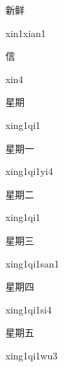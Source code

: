 \begin{multicols*}{2}
\begin{verbete}{新鲜}
\begin{pronuncia}{xin1xian1}
\end{pronuncia}
\end{verbete}

\begin{verbete}[xin4]{信}
\begin{pronuncia}{xin4}
\end{pronuncia}
\end{verbete}

\begin{verbete}[xing1qi1]{星期}
\begin{pronuncia}{xing1qi1}
\end{pronuncia}
\end{verbete}

\begin{verbete}[xing1qi1yi4]{星期一}
\begin{pronuncia}{xing1qi1yi4}
\end{pronuncia}
\end{verbete}

\begin{verbete}[xing1qi1]{星期二}
\begin{pronuncia}{xing1qi1}
\end{pronuncia}
\end{verbete}

\begin{verbete}{星期三}
\begin{pronuncia}{xing1qi1san1}
\end{pronuncia}
\end{verbete}

\begin{verbete}[xing1qi1si4]{星期四}
\begin{pronuncia}{xing1qi1si4}
\end{pronuncia}
\end{verbete}

\begin{verbete}[xing1qi1wu3]{星期五}
\begin{pronuncia}{xing1qi1wu3}
\end{pronuncia}
\end{verbete}


\end{multicols*}
